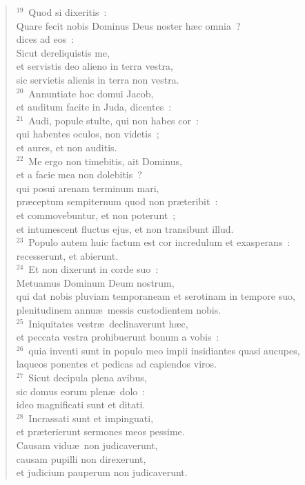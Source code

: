 \begin{verse}
${}^{19}$~Quod si dixeritis~:\\ Quare fecit nobis Dominus Deus noster h\ae c omnia~?\\ dices ad eos~:\\ Sicut dereliquistis me,\\ et servistis deo alieno in terra vestra,\\ sic servietis alienis in terra non vestra.\\
${}^{20}$~Annuntiate hoc domui Jacob,\\ et auditum facite in Juda, dicentes~:\\
${}^{21}$~Audi, popule stulte, qui non habes cor~:\\ qui habentes oculos, non videtis~;\\ et aures, et non auditis.\\
${}^{22}$~Me ergo non timebitis, ait Dominus,\\ et a facie mea non dolebitis~?\\ qui posui arenam terminum mari,\\ pr\ae ceptum sempiternum quod non pr\ae teribit~:\\ et commovebuntur, et non poterunt~;\\ et intumescent fluctus ejus, et non transibunt illud.\\
${}^{23}$~Populo autem huic factum est cor incredulum et exasperans~:\\ recesserunt, et abierunt.\\
${}^{24}$~Et non dixerunt in corde suo~:\\ Metuamus Dominum Deum nostrum,\\ qui dat nobis pluviam temporaneam et serotinam in tempore suo,\\ plenitudinem annu\ae\ messis custodientem nobis.\\
${}^{25}$~Iniquitates vestr\ae\ declinaverunt h\ae c,\\ et peccata vestra prohibuerunt bonum a vobis~:\\
${}^{26}$~quia inventi sunt in populo meo impii insidiantes quasi aucupes,\\ laqueos ponentes et pedicas ad capiendos viros.\\
${}^{27}$~Sicut decipula plena avibus,\\ sic domus eorum plen\ae\ dolo~:\\ ideo magnificati sunt et ditati.\\
${}^{28}$~Incrassati sunt et impinguati,\\ et pr\ae terierunt sermones meos pessime.\\ Causam vidu\ae\ non judicaverunt,\\ causam pupilli non direxerunt,\\ et judicium pauperum non judicaverunt.\\

\end{verse}

